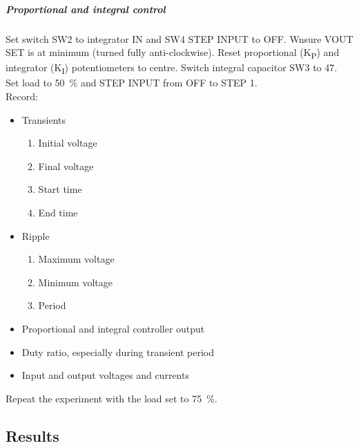 \subparagraph{Proportional and integral control}
Set switch SW2 to integrator IN and SW4 STEP INPUT to OFF. Wnsure VOUT SET is at minimum (turned fully anti-clockwise).
Reset proportional (K\textsubscript{P}) and integrator (K\textsubscript{I}) potentiometers to centre. Switch integral capacitor SW3 to \qty{47}{\nF}.
Set load to \qty{50}{\percent} and STEP INPUT from OFF to STEP 1.\\
Record:
\begin{itemize}
    \item Transients
          \begin{enumerate}
              \item Initial voltage
              \item Final voltage
              \item Start time
              \item End time
          \end{enumerate}
    \item Ripple
          \begin{enumerate}
              \item Maximum voltage
              \item Minimum voltage
              \item Period
          \end{enumerate}
    \item Proportional and integral controller output
    \item Duty ratio, especially during transient period
    \item Input and output voltages and currents
\end{itemize}

Repeat the experiment with the load set to \qty{75}{\percent}.
\clearpage
\subsection{Results}
